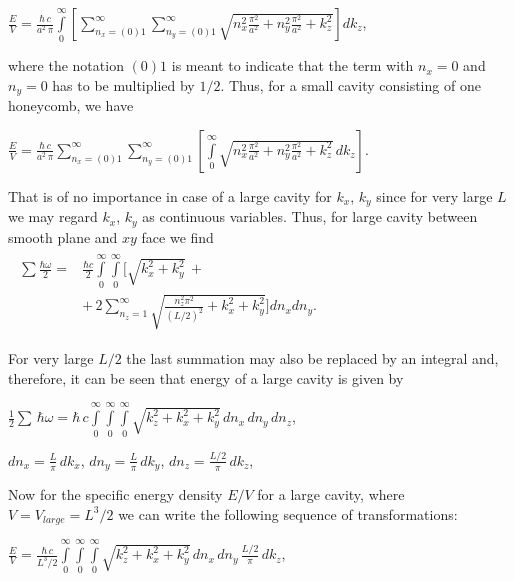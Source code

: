 \documentclass[twoside, 10pt, ptm]{article}
\begin{document}
\begin{multicols}{2}
\noindent
\(\frac{E}{V} = \frac{\hbar\,c}{a^2\,\pi}\int\limits_{0}^{\infty}\left[{\sum\limits_{n_x=(0)1}^{\infty}\sum\limits_{n_y=(0)1}^{\infty}\sqrt{n_x^2\frac{\pi^2}{a^2}+n_y^2\frac{\pi^2}{a^2}+k_z^2}}\right] dk_z\),

    where the notation \(\left(0\right) 1\) is meant to indicate that the
term with \(n_x = 0\) and \(n_y = 0\) has to be multiplied by
\(1\big/2\). Thus, for a small cavity consisting of one honeycomb, we have

    \(\frac{E}{V} = \frac{\hbar\,c}{a^2\,\pi}\sum\limits_{n_x=(0)1}^{\infty}\sum\limits_{n_y=(0)1}^{\infty}\left[\int\limits_{0}^{\infty}\sqrt{n_x^2\frac{\pi^2}{a^2}+n_y^2\frac{\pi^2}{a^2}+k_z^2}\,dk_z\right]\).

    That is of no importance in case of a large cavity for \(k_x\), \(k_y\)
since for very large \(L\) we may regard \(k_x\), \(k_y\) as
continuous variables. Thus, for large cavity between smooth plane and \(xy\) face we find
\noindent
\(\begin{array}{c}
\begin{array}{ll}
    \sum\frac{\hbar\omega}{2} = & \frac{\hbar c}{2}\int\limits_{0}^{\infty}\int\limits_{0}^{\infty}\Bigg[\sqrt{k_x^2+k_y^2}\,+ \\
   & +\,2\sum\limits_{n_z=1}^{\infty}\sqrt{\frac{n_z^2 \pi^2}{(L/2)^2}+k_x^2+k_y^2}\Bigg]d{n_x}d{n_y}.
\end{array}
\end{array}\)


    For very large \(L/2\) the last summation may also be replaced by an
integral and, therefore, it can be seen that energy of a large cavity is given by

    \(\frac{1}{2}\sum\,\hbar\omega = \hbar\,c\int\limits_{0}^{\infty}\int\limits_{0}^{\infty}\int\limits_{0}^{\infty}\sqrt{k_z^2+k_x^2+k_y^2}\,d{n_x}\,d{n_y}\,d{n_z}\),

    \(dn_x = \frac{L}{\pi}\,dk_x\), \(dn_y = \frac{L}{\pi}\,dk_y\),
\(dn_z = \frac{L/2}{\pi}\,dk_z\),

    Now for the specific energy density \(E/V\) for a large cavity, where
\(V = V_{large} = L^3/2\) we can write the following sequence of transformations:

\noindent
    \(\frac{E}{V} = \frac{\hbar\,c}{L^3/2}\int\limits_{0}^{\infty}\int\limits_{0}^{\infty}\int\limits_{0}^{\infty}\sqrt{k_z^2+k_x^2+k_y^2}\,dn_x\,dn_y\,\frac{L/2}{\pi}\,dk_z\),


\end{multicols}
\end{document}

